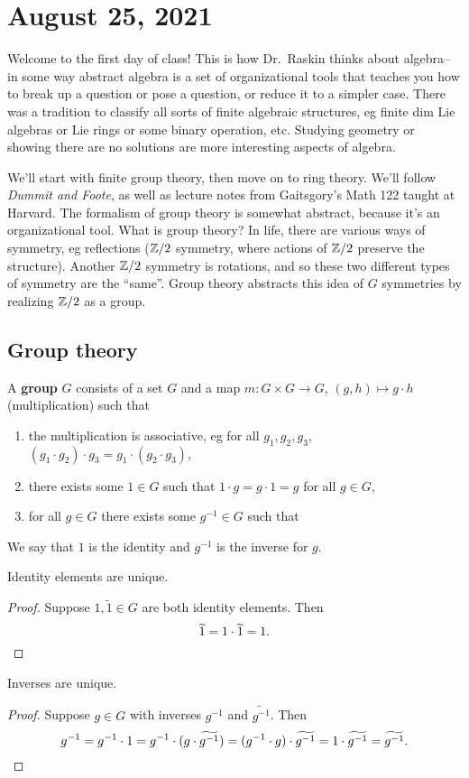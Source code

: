 \section{August 25, 2021}
Welcome to the first day of class! This is how Dr.\ Raskin thinks about algebra-- in some way abstract algebra is a set of organizational tools that teaches you how to break up a question or pose a question, or reduce it to a simpler case. There was a tradition to classify all sorts of finite algebraic structures, eg finite dim Lie algebras or Lie rings or some binary operation, etc. Studying geometry or showing there are no solutions are more interesting aspects of algebra.

We'll start with finite group theory, then move on to ring theory. We'll follow \emph{Dummit and Foote}, as well as lecture notes from Gaitsgory's Math 122 taught at Harvard. The formalism of group theory is somewhat abstract, because it's an organizational tool. What is group theory? In life, there are various ways of symmetry, eg reflections ($\mathbb{Z} /2$ symmetry, where actions of $\mathbb{Z} /2$ preserve the structure). Another $\mathbb{Z} /2$ symmetry is rotations, and so these two different types of symmetry are the ``same''. Group theory abstracts this idea of $G$ symmetries by realizing $\mathbb{Z} /2$ as a group.

\subsection{Group theory}
\begin{definition}[]
    A \textbf{group} $G$ consists of a set $G$ and a map $m \colon G \times G \to G$, $(g,h) \mapsto g\cdot h$ (multiplication) such that
    \begin{enumerate}[label=(\alph*)]
    \setlength\itemsep{-.2em}
        \item the multiplication is associative, eg for all $g_1,g_2,g_3$, $(g_1 \cdot g_2) \cdot g_3= g_1 \cdot (g_2 \cdot g_3),$ 
    \item there exists some $1 \in G$ such that $1 \cdot g =g \cdot 1=g$ for all $g \in G$, 
    \item for all $g \in G$ there exists some $g ^{-1} \in G$ such that 
    \end{enumerate}
    We say that $1$ is the identity and $g^{-1}$ is the inverse for $g$.
\end{definition}
\begin{lemma}
    Identity elements are unique.
\end{lemma}
\begin{proof}
    Suppose $1, \widetilde 1\in G$ are both identity elements. Then \[
    \widetilde 1= 1 \cdot \widetilde 1=1.\qedhere
    \] 
\end{proof}
\begin{lemma}
    Inverses are unique.
\end{lemma}
\begin{proof}
    Suppose $g \in G$ with inverses $g ^{-1}$ and $\widetilde{g ^{-1}} $. Then \[
        g^{-1} = g^{-1} \cdot 1=g^{-1}\cdot (g \cdot \widetilde {g^{-1}} )=(g^{-1} \cdot g) \cdot \widetilde {g^{-1}} =1 \cdot \widetilde {g^{-1}} =\widetilde {g^{-1}} .\qedhere
    \] 
\end{proof}

